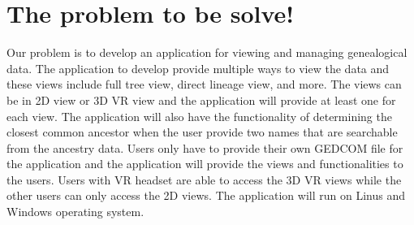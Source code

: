 \documentclass[onecolumn, draftclsnofoot, 10pt, compsoc]{IEEEtran}
\begin{document}
\section{The problem to be solve!}
\begin{singlespace}

Our problem is to develop an application for viewing and managing genealogical data. The application to develop provide multiple ways to view the data and these views include full tree view, direct lineage view, and more. The views can be in 2D view or 3D VR view and the application will provide at least one for each view. The application will also have the functionality of determining the closest common ancestor when the user provide two names that are searchable from the ancestry data. Users only have to provide their own GEDCOM file for the application and the application will provide the views and functionalities to the users. Users with VR headset are able to access the 3D VR views while the other users can only access the 2D views. The application will run on Linus and Windows operating system.

\end{singlespace}
\end{document}
